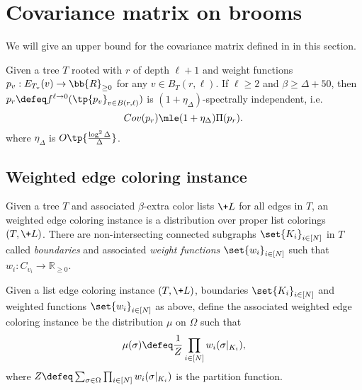 \documentclass[a4paper,11pt]{article}
\begin{document}
 
\section{Covariance matrix on brooms}\label{sec:covariance}
We will give an upper bound for the covariance matrix defined in  in this section.
\begin{lemma}\label{lem:SI-broom}
    Given a tree $T$ rooted with $r$ of depth $\ell+1$ and weight functions $\*p_v:E_{T_v}(v)\rightarrow \bb{R}_{\geq 0}$ for any $v\in B_T(r,\ell)$. If $\ell\geq 2$ and $\beta \geq \Delta + 50$, then $\*p_r\defeq  f^{\ell\rightarrow 0}(\tp{\*p_v}_{v\in B(r,\ell)})$ is $(1+\eta_\Delta)$-spectrally independent, i.e.
    \[
    \!{Cov}(\*p_r)\mle (1+\eta_{\Delta})\Pi(\*p_r).
    \]
    where $\eta_{\Delta}$ is $O\tp{\frac{\log^2 \Delta}{\Delta}}$.
\end{lemma}
\subsection{Weighted edge coloring instance}
\label{sec:weight-edge-coloring}
Given a tree $T$ and associated $\beta$-extra color lists $\+L$ for all edges in $T$, an weighted edge coloring instance is a distribution over proper list colorings $(T, \+L)$.
There are non-intersecting connected subgraphs $\set{K_i}_{i\in [N]}$ in $T$
called \emph{boundaries} and associated \emph{weight functions} $\set{w_i}_{i\in [N]}$
such that $w_i : C_{v_i} \to \mathbb R_{\ge 0}$.
\begin{definition}\label{def:weighted-coloring}    
    Given a list edge coloring instance $(T, \+L)$,
    boundaries $\set{K_i}_{i\in [N]}$
    and weighted functions $\set{w_i}_{i\in [N]}$
    as above, define the associated weighted edge coloring instance
    be the distribution $\mu$ on $\Omega$ such that
    \begin{align*}
        \mu(\sigma) \defeq \frac1Z \prod_{i\in [N]} w_i(\sigma|_{K_i}),
    \end{align*}
    where $Z\defeq \sum_{\sigma\in \Omega}\prod_{i\in [N]} w_i(\sigma|_{K_i})$
    is the partition function.
\end{definition}
\end{document}
